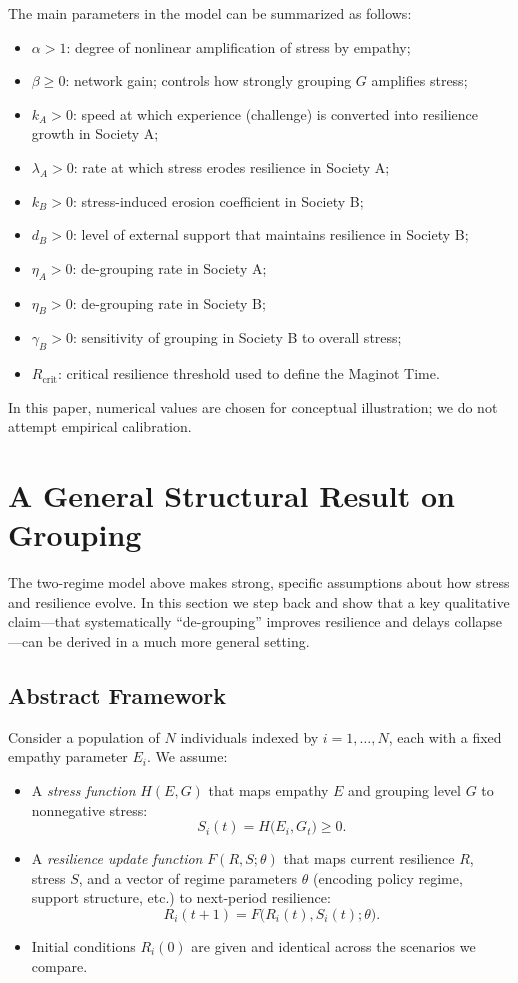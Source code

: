 \documentclass[11pt]{article}
\theoremstyle{plain}
\begin{document}
The main parameters in the model can be summarized as follows:
\begin{itemize}
  \item $\alpha > 1$: degree of nonlinear amplification of stress by empathy;
  \item $\beta \ge 0$: network gain; controls how strongly grouping $G$ amplifies stress;
  \item $k_A > 0$: speed at which experience (challenge) is converted into resilience growth in Society A;
  \item $\lambda_A > 0$: rate at which stress erodes resilience in Society A;
  \item $k_B > 0$: stress-induced erosion coefficient in Society B;
  \item $d_B > 0$: level of external support that maintains resilience in Society B;
  \item $\eta_A > 0$: de-grouping rate in Society A;
  \item $\eta_B > 0$: de-grouping rate in Society B;
  \item $\gamma_B > 0$: sensitivity of grouping in Society B to overall stress;
  \item $R_{\text{crit}}$: critical resilience threshold used to define the Maginot Time.
\end{itemize}

In this paper, numerical values are chosen for conceptual illustration; we do not attempt empirical calibration.

\section{A General Structural Result on Grouping}
\label{sec:general}

The two-regime model above makes strong, specific assumptions about how stress and resilience evolve.
In this section we step back and show that a key qualitative claim---that systematically ``de-grouping'' improves resilience and delays collapse---can be derived in a much more general setting.

\subsection{Abstract Framework}

Consider a population of $N$ individuals indexed by $i=1,\dots,N$, each with a fixed empathy parameter $E_i$.
We assume:
\begin{itemize}
  \item A \emph{stress function} $H(E,G)$ that maps empathy $E$ and grouping level $G$ to nonnegative stress:
  \[
  S_i(t) = H\bigl(E_i, G_t\bigr) \ge 0.
  \]
  \item A \emph{resilience update function} $F(R,S;\theta)$ that maps current resilience $R$, stress $S$, and a vector of regime parameters $\theta$ (encoding policy regime, support structure, etc.) to next-period resilience:
  \[
  R_i(t+1) = F\bigl(R_i(t), S_i(t); \theta\bigr).
  \]
  \item Initial conditions $R_i(0)$ are given and identical across the scenarios we compare.
\end{itemize}
\end{document}
